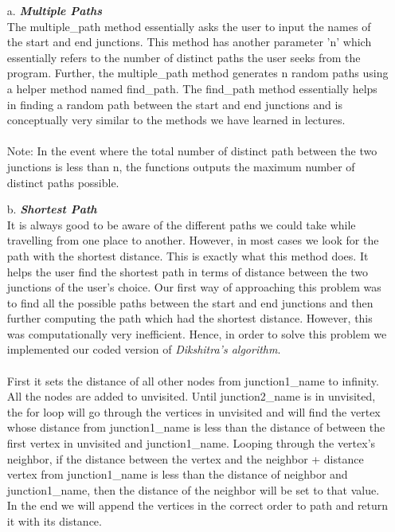 \documentclass[fontsize=11pt]{IEEEtran}
\begin{document}
\begin{enumerate}
   \item[a.] \textbf{\textit{Multiple Paths}}
\\
   The multiple\_path method essentially asks the user to input the names of the start and end junctions. This method has another parameter 'n' which essentially refers to the number of distinct paths the user seeks from the program. Further, the  multiple\_path method  generates  n random paths using a helper method named find\_path. The find\_path method essentially helps in finding a random path between the start and end junctions and is conceptually very similar to the methods we have learned in lectures. \\
   \\
   Note: In the event where the total number of distinct path between the two junctions is less than n, the functions outputs the maximum number of distinct paths possible.
\\
   \item[b.] \textbf{\textit{Shortest Path}}\\
   It is always good  to be aware of the different paths we could take while travelling from one place to another. However, in most cases  we look for the path with the shortest distance. This is exactly what this method does. It helps the user find the shortest path in terms of distance between the two junctions of the user's choice. Our first way of approaching this problem was to find all the possible paths between the start and end junctions and then further computing the path which had the shortest distance. However, this was computationally very inefficient. Hence, in order to solve this problem we implemented our coded version of \textit{Dikshitra's algorithm}. \cite{3} \\
   \\
   First it sets the distance of all other nodes from junction1\_name to infinity. All the nodes are added to unvisited. Until junction2\_name is in unvisited, the for loop will go through the vertices in unvisited and will find the vertex whose distance from junction1\_name is less than the distance of  between the first vertex in unvisited and junction1\_name. Looping through the vertex’s neighbor, if the distance between the vertex and the neighbor + distance vertex from junction1\_name is less than the distance of neighbor and junction1\_name, then the distance of the neighbor will be set to that value. In the end we will append the vertices in the correct order to path and return it with its distance.

\end{enumerate}
\end{document}
